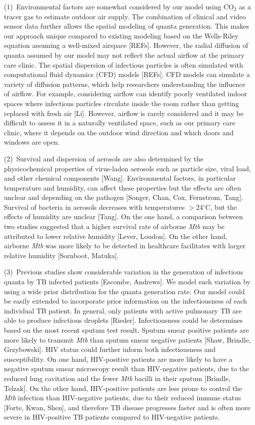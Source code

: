 \documentclass[fleqn,11pt]{wlscirep}
\begin{document}
(1)~Environmental factors are somewhat considered by our model using CO$_2$ as a tracer gas to estimate outdoor air supply. The combination of clinical and video sensor data further allows the spatial modeling of quanta generation. This makes our approach unique compared to existing modeling based on the Wells-Riley equation assuming a well-mixed airspace [REFs]. However, the radial diffusion of quanta assumed by our model may not reflect the actual airflow at the primary care clinic. The spatial dispersion of infectious particles is often simulated with computational fluid dynamics (CFD) models [REFs]. CFD models can simulate a variety of diffusion patterns, which help researchers understanding the influence of airflow. For example, considering airflow can identify poorly ventilated indoor spaces where infectious particles circulate inside the room rather than getting replaced with fresh air [Li]. However, airflow is rarely considered and it may be difficult to assess it in a naturally ventilated space, such as our primary care clinic, where it depends on the outdoor wind direction and which doors and windows are open. 

(2)~Survival and dispersion of aerosols are also determined by the physicochemical properties of virus-laden aerosols such as particle size, viral load, and other chemical components [Wang].  Environmental factors, in particular temperature and humidity, can affect these properties but the effects are often unclear and depending on the pathogen [Songer, Chan, Cox, Fernstrom, Tang]. Survival of bacteria in aerosols decreases with temperatures $>$24$^{\circ}$C, but the effects of humidity are unclear [Tang]. On the one hand, a comparison between two studies suggested that a higher survival rate of airborne \emph{Mtb} may be attributed to lower relative humidity [Lever, Loudon]. On the other hand, airborne \emph{Mtb} was more likely to be detected in healthcare facilitates with larger relative humidity [Sornboot, Matuka].   


(3)~Previous studies show considerable variation in the generation of infectious quanta by TB infected patients [Escombe, Andrews]. We model such variation by using a wide prior distribution for the quanta generation rate. Our model could be easily extended to incorporate prior information on the infectiousness of each individual TB patient. In general, only patients with active pulmonary TB are able to produce infectious droplets [Rieder]. Infectiousness could be determines based on the most recent sputum test result. Sputum smear positive patients are more likely to transmit \emph{Mtb} than sputum smear negative patients [Shaw, Brindle, Grzybowski]. HIV status could further inform both infectiousness and susceptibility. On one hand, HIV-positive patients are more likely to have a negative sputum smear microscopy result than HIV-negative patients, due to the reduced lung cavitation and the fewer \emph{Mtb} bacilli in their sputum [Brindle, Telzak]. On the other hand, HIV-positive patients are less prone to control the \emph{Mtb} infection than HIV-negative patients, due to their reduced immune status [Forte, Kwan, Shen], and therefore TB disease progresses faster and is often more severe in HIV-positive TB patients compared to HIV-negative patients. 
\end{document}
